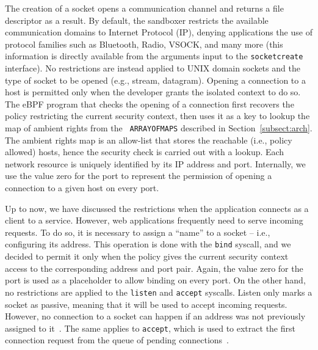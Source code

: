 The creation of a socket opens a communication channel and returns a
file descriptor as a result. By default, the sandboxer restricts the
available communication domains to Internet Protocol (IP), denying
applications the use of protocol families such as Bluetooth, Radio,
VSOCK, and many more (this information is directly available
  from the arguments input to the {\tt socket\textunderscore create}
  interface). No restrictions are instead applied to UNIX domain
sockets and the type of socket to be opened (e.g., stream,
datagram). Opening a connection to a host is permitted only when the
developer grants the isolated context to do so. The eBPF
program that checks the opening of a connection first
  recovers the policy restricting the current security context, then
  uses it as a key to lookup the map of ambient rights from the {\tt
    ARRAY\textunderscore OF\textunderscore MAPS} described in
  Section~\ref{subsect:arch}. The ambient rights map is an allow-list
  that stores the reachable (i.e., policy allowed) hosts, hence the
  security check is carried out with a lookup. Each network resource
is uniquely identified by its IP address and port. Internally,
we use the value zero for the port to represent the
  permission of opening a connection to a given host on every port.

Up to now, we have discussed the restrictions when
the application connects as a client to a service. However, web
applications frequently need to serve incoming requests. To do so, it
is necessary to assign a ``name'' to a socket -- i.e., configuring its
address. This operation is done with the {\tt bind} syscall,
  and we decided to permit it only when the policy 
  gives the current security context access to the corresponding
address and port pair. Again, the value zero for the port is used as a
placeholder to allow binding on every port. On the other hand, no
restrictions are applied to the {\tt listen} and {\tt accept}
syscalls. Listen only marks a socket as passive, meaning that it will
be used to accept incoming requests. However, no connection to a
socket can happen if an address was not previously assigned to
it~\cite{doc-listen}.  The same applies to {\tt accept}, which is used
to extract the first connection request from the queue of pending
connections~\cite{doc-accept}.

